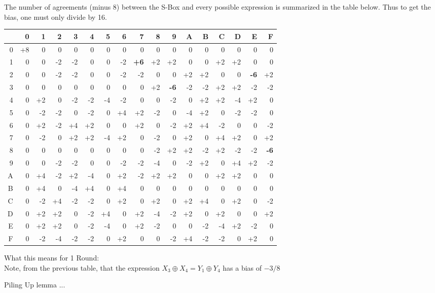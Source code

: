 \documentclass[9pt]{beamer}
\begin{document}
\begin{frame}
The number of agreements (minus 8) between the S-Box and every possible expression is summarized in the table below. Thus to get the bias, one must only divide by 16.\\
\vspace{5mm}
\tiny
\begin{tabular}{|r|r|r|r|r|r|r|r|r|r|r|r|r|r|r|r|r|}
\hline
 &0&1&2&3&4&5&6&7&8&9&A&B&C&D&E&F\\
\hline
0&+8&0&0&0&0&0&0&0&0&0&0&0&0&0&0&0 \\
\hline
1&0&0&-2&-2&0&0&-2&\textbf{+6}&+2&+2&0&0&+2&+2&0&0 \\
\hline
2&0&0&-2&-2&0&0&-2&-2&0&0&+2&+2&0&0&\textbf{-6}&+2 \\
\hline
3&0&0&0&0&0&0&0&0&+2&\textbf{-6}&-2&-2&+2&+2&-2&-2 \\
\hline
4&0&+2&0&-2&-2&-4&-2&0&0&-2&0&+2&+2&-4&+2&0 \\
\hline
5&0&-2&-2&0&-2&0&+4&+2&-2&0&-4&+2&0&-2&-2&0  \\
\hline
6&0&+2&-2&+4&+2&0&0&+2&0&-2&+2&+4&-2&0&0&-2 \\
\hline
7&0&-2&0&+2&+2&-4&+2&0&-2&0&+2&0&+4&+2&0&+2  \\
\hline
8&0&0&0&0&0&0&0&0&-2&+2&+2&-2&+2&-2&-2&\textbf{-6} \\
\hline
9&0&0&-2&-2&0&0&-2&-2&-4&0&-2&+2&0&+4&+2&-2 \\
\hline
A&0&+4&-2&+2&-4&0&+2&-2&+2&+2&0&0&+2&+2&0&0 \\
\hline
B&0&+4&0&-4&+4&0&+4&0&0&0&0&0&0&0&0&0 \\
\hline
C&0&-2&+4&-2&-2&0&+2&0&+2&0&+2&+4&0&+2&0&-2 \\ 
\hline
D&0&+2&+2&0&-2&+4&0&+2&-4&-2&+2&0&+2&0&0&+2 \\
\hline
E&0&+2&+2&0&-2&-4&0&+2&-2&0&0&-2&-4&+2&-2&0 \\
\hline
F&0&-2&-4&-2&-2&0&+2&0&0&-2&+4&-2&-2&0&+2&0 \\
\hline
\end{tabular}
\small
\end{frame}

\begin{frame}
What this means for 1 Round:\\
\vspace{5mm}
Note, from the previous table, that the expression $X_3 \oplus X_4 = Y_1 \oplus Y_4$ has a bias of $-3/8$

\end{frame}

\begin{frame}
Piling Up lemma ...

\end{frame}
\end{document}
